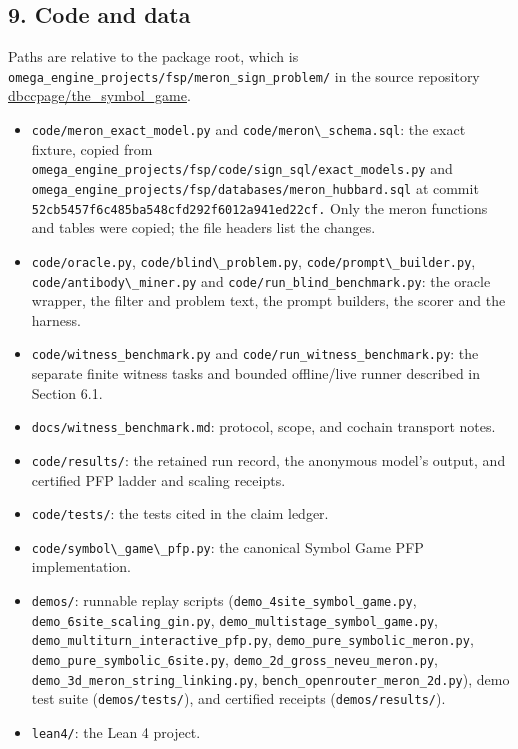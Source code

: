 \documentclass[
  11pt,
]{article}
\newcommand{\passthrough}[1]{#1}
\providecommand{\tightlist}{%
  \setlength{\itemsep}{0pt}\setlength{\parskip}{0pt}}
\begin{document}
\subsection{9. Code and data}\label{code-and-data}

Paths are relative to the package root, which is
\nolinkurl{omega_engine_projects/fsp/meron_sign_problem/} in the source
repository
\href{https://github.com/dbccpage/the_symbol_game}{dbccpage/the\_symbol\_game}.

\begin{itemize}
\tightlist
\item
  \nolinkurl{code/meron_exact_model.py} and
  \passthrough{\lstinline!code/meron\_schema.sql!}: the exact fixture,
  copied from
  \nolinkurl{omega_engine_projects/fsp/code/sign_sql/exact_models.py}
  and \nolinkurl{omega_engine_projects/fsp/databases/meron_hubbard.sql}
  at commit \nolinkurl{52cb5457f6c485ba548cfd292f6012a941ed22cf.} Only
  the meron functions and tables were copied; the file headers list the
  changes.
\item
  \passthrough{\lstinline!code/oracle.py!},
  \passthrough{\lstinline!code/blind\_problem.py!},
  \passthrough{\lstinline!code/prompt\_builder.py!},
  \passthrough{\lstinline!code/antibody\_miner.py!} and
  \nolinkurl{code/run_blind_benchmark.py}: the oracle wrapper, the
  filter and problem text, the prompt builders, the scorer and the
  harness.
\item
  \nolinkurl{code/witness_benchmark.py} and
  \nolinkurl{code/run_witness_benchmark.py}: the separate finite witness
  tasks and bounded offline/live runner described in Section 6.1.
\item
  \nolinkurl{docs/witness_benchmark.md}: protocol, scope, and cochain
  transport notes.
\item
  \passthrough{\lstinline!code/results/!}: the retained run record, the
  anonymous model's output, and certified PFP ladder and scaling
  receipts.
\item
  \passthrough{\lstinline!code/tests/!}: the tests cited in the claim
  ledger.
\item
  \passthrough{\lstinline!code/symbol\_game\_pfp.py!}: the canonical
  Symbol Game PFP implementation.
\item
  \passthrough{\lstinline!demos/!}: runnable replay scripts
  (\nolinkurl{demo_4site_symbol_game.py},
  \nolinkurl{demo_6site_scaling_gin.py},
  \nolinkurl{demo_multistage_symbol_game.py},
  \nolinkurl{demo_multiturn_interactive_pfp.py},
  \nolinkurl{demo_pure_symbolic_meron.py},
  \nolinkurl{demo_pure_symbolic_6site.py},
  \nolinkurl{demo_2d_gross_neveu_meron.py},
  \nolinkurl{demo_3d_meron_string_linking.py},
  \nolinkurl{bench_openrouter_meron_2d.py}), demo test suite
  (\passthrough{\lstinline!demos/tests/!}), and certified receipts
  (\passthrough{\lstinline!demos/results/!}).
\item
  \passthrough{\lstinline!lean4/!}: the Lean 4 project.
\end{itemize}
\end{document}
